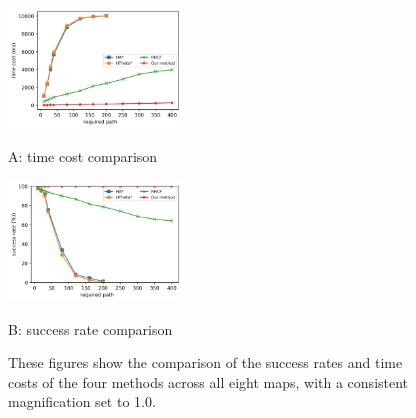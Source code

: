 \documentclass[lettersize,journal]{IEEEtran}
\begin{document}
\begin{figure}[t] \scriptsize
\begin{minipage}{.48\linewidth}
  \centerline{\includegraphics[width=4.6cm]{comparison_time_and_count.png}}
  \centerline{A: time cost comparison}
\end{minipage}
\hfill
\begin{minipage}{.48\linewidth}
  \centerline{\includegraphics[width=4.6cm]{comparison_succ_and_count.png}}
  \centerline{B: success rate comparison}
\end{minipage}
\vfill

\caption{These figures show the comparison of the success rates and time costs of the four methods across all eight maps, with a consistent magnification set to 1.0.}
\label{compariosn_between_methods}
\end{figure}



\end{document}
